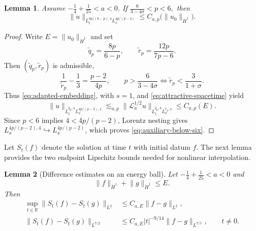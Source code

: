 \documentclass[preprint,12pt]{elsarticle}
\numberwithin{equation}{section}
\newtheorem{lemma}{Lemma}[section]
\theoremstyle{definition}
\theoremstyle{remark}
\newcommand{\R}{\mathbb R}
\newcommand{\cL}{\mathcal L}
\newcommand{\norm}[2]{\lVert #1\rVert_{#2}}
\begin{document}
\begin{lemma}%
\label{lem:auxiliary-below-six}
Assume $-\frac14+\frac1{25}<a<0$.  If $\frac6{3-4\sigma}<p<6,$ then
\begin{equation}
 \norm{u}{L_t^{8p/(6-p),4}L_x^{4p/(p-2)}}
 \leq C_{a,p}\bigl(\norm{u_0}{\dot H^1}\bigr).
 \label{eq:auxiliary-below-six}
\end{equation}
\end{lemma}

\begin{proof}
Write $E=\norm{u_0}{\dot H^1}$ and set
\[
 \widetilde q_p=\frac{8p}{6-p},
 \qquad \widetilde r_p=\frac{12p}{7p-6}.
\]
Then $(\widetilde q_p,\widetilde r_p)$ is admissible,
\[
\frac1{\widetilde r_p}-\frac13=\frac{p-2}{4p},
\qquad
p>\frac6{3-4\sigma}
\iff
\widetilde r_p<\frac3{1+\sigma}.
\]
Thus \eqref{eq:adapted-embedding}, with $s=1$, and
\eqref{eq:attractive-spacetime} yield
\[
\norm{u}{L_t^{\widetilde q_p,4}L_x^{4p/(p-2),4}}
\lesssim_{a,p}
\norm{\cL_a^{1/2}u}
{L_t^{\widetilde q_p,4}L_x^{\widetilde r_p,4}}
\leq C_{a,p}(E).
\]
Since $p<6$ implies $4<4p/(p-2)$, Lorentz nesting gives
$L_x^{4p/(p-2),4}\hookrightarrow L_x^{4p/(p-2)}$, which proves
\eqref{eq:auxiliary-below-six}.
\end{proof}









Let $S_t(f)$ denote the solution at time $t$ with initial datum $f$.
The next lemma provides the two endpoint Lipschitz bounds needed for
nonlinear interpolation.

\begin{lemma}[Difference estimates on an energy ball]
\label{lem:difference}
Let $-\frac14+\frac1{25}<a<0$ and
\[
 \norm{f}{\dot H^1}+\norm{g}{\dot H^1}\leq E.
\]
Then
\begin{align}
 \sup_{t\in\R}\norm{S_t(f)-S_t(g)}{L^2}
 &\leq C_{a,E}\norm{f-g}{L^2}, \label{eq:difference-L2}\\
 \norm{S_t(f)-S_t(g)}{L^{7/2}}
 &\leq C_{a,E}|t|^{-9/14}\norm{f-g}{L^{7/5}},
 \qquad t\neq0. \label{eq:difference-seven}
\end{align}
\end{lemma}
\end{document}
